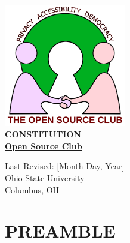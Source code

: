 \documentclass[12pt,letterpaper]{article}
\begin{document}
\renewcommand{\labelitemi}{\textcolor{crimsonred}{\ding{68}}}
\renewcommand{\labelitemii}{\textcolor{crimsonred}{\ding{67}}}
\renewcommand{\labelitemiii}{\textcolor{crimsonred}{\ding{66}}}

\begin{titlepage}
\begin{center}
\vspace*{1cm}

\includegraphics[width=0.4\textwidth]{logo.png}\\[2cm]

{\LARGE\bfseries\color{crimsonred} CONSTITUTION\\[0.5cm]}
{\huge\bfseries\color{crimsonred} \underline{Open Source Club}\\[1cm]}

{\large Last Revised: [Month Day, Year]}\\[3cm]

\vfill
{\large Ohio State University}\\
{\large Columbus, OH}\\[1cm]
\end{center}
\end{titlepage}

\tableofcontents
\clearpage

\section*{PREAMBLE}
\end{document}
